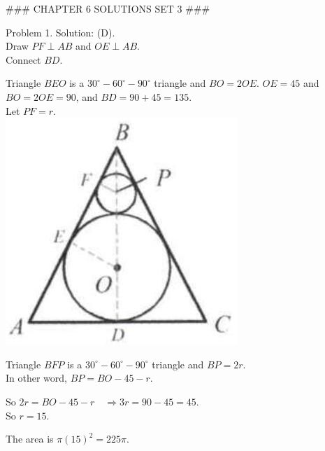 \documentclass[10pt]{article}
\begin{document}
### CHAPTER 6 SOLUTIONS SET 3 ###

Problem 1. Solution: (D).\\
Draw \(P F \perp A B\) and \(O E \perp A B\).\\
Connect \(B D\).

Triangle \(B E O\) is a \(30^{\circ}-60^{\circ}-90^{\circ}\) triangle and \(B O=2 O E\). \(O E=45\) and \(B O=2 O E=90\), and \(B D=90+45=135\).\\
Let \(P F=r\).\\
\includegraphics[max width=\textwidth, center]{2025_04_17_97bc1f7e44d93c271a88g-187(2)}

Triangle \(B F P\) is a \(30^{\circ}-60^{\circ}-90^{\circ}\) triangle and \(B P=2 r\).\\
In other word, \(B P=B O-45-r\).

So \(2 r=B O-45-r \quad \Rightarrow 3 r=90-45=45\).\\
So \(r=15\).

The area is \(\pi(15)^{2}=225 \pi\).
\end{document}

